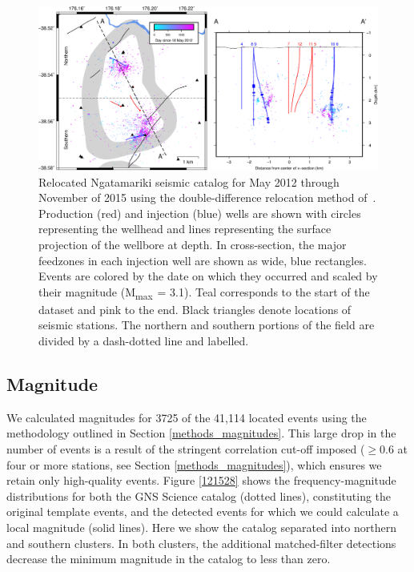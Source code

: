 \begin{figure}[h!]
\begin{center}
\includegraphics[width=1.00\columnwidth]{Chapter_3_Nga/figures/mrp_hypoDD_Nga_detections_hypoDD/mrp_DD_Nga_dets_GC_11-28-18_original}
\caption{{Relocated Ngatamariki seismic catalog for May 2012 through November of
2015 using the double-difference relocation method
of~\protect\citet{Trugman_2017}. Production (red) and injection (blue) wells are
shown with circles representing the wellhead and lines representing the
surface projection of the wellbore at depth. In cross-section, the major
feedzones in each injection well are shown as wide, blue rectangles.
Events are colored by the date on which they occurred and scaled by
their magnitude (M\textsubscript{max~}= 3.1). Teal corresponds to the
start of the dataset and pink to the end. Black triangles denote
locations of seismic stations. The northern and southern portions of the
field are divided by a dash-dotted line and labelled.
{\label{827409}}%
}}
\end{center}
\end{figure}

\subsection{Magnitude}
We calculated magnitudes for 3725 of the 41,114 located events using the methodology outlined in Section \ref{methods_magnitudes}. This large drop in the number of events is a result of the stringent correlation cut-off imposed ($\geq$0.6 at four or more stations, see Section \ref{methods_magnitudes}), which ensures we retain only high-quality events. Figure \ref{121528} shows the frequency-magnitude distributions for both the GNS Science catalog (dotted lines), constituting the original template events, and the detected events for which we could calculate a local magnitude (solid lines). Here we show the catalog separated into northern and southern clusters. In both clusters, the additional matched-filter detections decrease the minimum magnitude in the catalog to less than zero.

